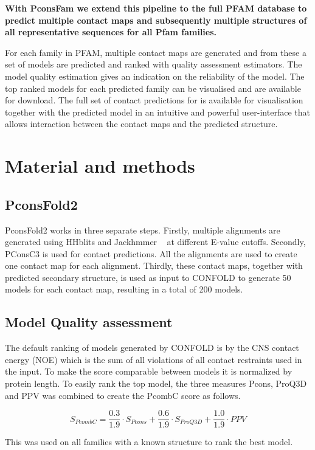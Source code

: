 \documentclass[a4,center,fleqn]{NAR}
\begin{document}
{\bf With
PconsFam we extend this pipeline to the full PFAM database to predict
multiple contact maps and subsequently multiple structures of all
representative sequences for all Pfam families. }

For each family in
PFAM, multiple contact maps are generated and from these a set of
models are predicted and ranked with quality assessment
estimators. The model quality estimation gives an indication on the
reliability of the model. 
\newpage
The top ranked models for each predicted
family can be visualised and are available for download. The full set
of contact predictions for is available for visualisation together
with the predicted model in an intuitive and powerful user-interface
that allows interaction between the contact maps and the predicted
structure. 

\section{Material and methods}
\subsection{PconsFold2}
PconsFold2 works in three separate steps. Firstly, multiple alignments
are generated using HHblits and Jackhmmer ~\cite{eddy22039361} at different 
E-value cutoffs.
Secondly, PConsC3 is used for contact predictions. All the alignments are used to 
create one contact map for each alignment.
Thirdly, these contact maps, together with predicted secondary structure, is used
as input to CONFOLD to generate 50 models for each contact map, resulting in a total
of 200 models.

\subsection{Model Quality assessment}
The default ranking of models generated by CONFOLD is by the CNS contact energy (NOE) 
which is the sum of all violations of all contact restraints used in the input.
To make the score comparable between models it is normalized by protein length.
To easily rank the top model, the three measures Pcons, ProQ3D and PPV was 
combined to create the PcombC score as follows.

$$
S_{PcombC} = \frac{0.3}{1.9} \cdot S_{Pcons} + \frac{0.6}{1.9} \cdot S_{ProQ3D} + \frac{1.0}{1.9} \cdot PPV
$$

This was used on all families with a known structure to rank the best model.
\end{document}
